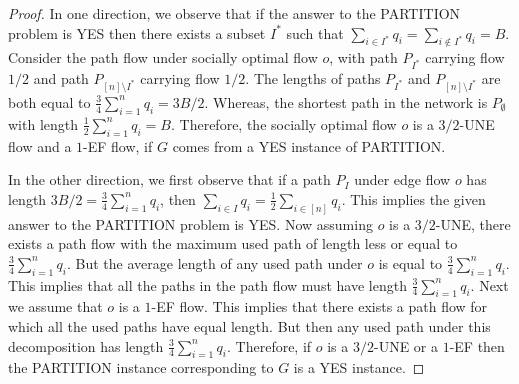 \begin{proof}
In one direction, we observe that if the answer to the PARTITION problem is YES then there exists a subset $I^*$ such that $\sum_{i\in I^*} q_i = \sum_{i \notin I^*}q_i = B$. Consider the path flow under socially optimal flow $o$, with path $P_{I^*}$ carrying flow $1/2$ and path $P_{[n]\setminus I^*}$ carrying flow $1/2$.  The lengths of paths $P_{I^*}$ and $P_{[n]\setminus I^*}$ are both  equal to $\frac{3}{4}\sum_{i=1}^{n} q_i = 3B/2$. Whereas, the shortest path in the network is  $P_{\emptyset}$  with length $\frac{1}{2}\sum_{i=1}^{n} q_i = B$. Therefore, the socially optimal flow $o$ is a $3/2$-UNE flow and a $1$-EF flow, if $G$ comes from a YES instance of PARTITION. 



In the other direction, we first observe that if a path $P_{I}$ under edge flow $o$ has length $3B/2 = \frac{3}{4}\sum_{i=1}^{n} q_i$, then $\sum_{i\in I} q_i = \frac{1}{2}\sum_{i\in [n]} q_i$. This implies the given answer to the PARTITION problem is YES. Now assuming $o$ is a $3/2$-UNE, there exists a path flow with the maximum used path of length less or equal to $\frac{3}{4}\sum_{i=1}^{n} q_i$. But the average length of any used path under $o$ is equal to $\frac{3}{4}\sum_{i=1}^{n} q_i$. This implies that all the paths in the path flow must have length $\frac{3}{4}\sum_{i=1}^{n} q_i$.  Next we assume that $o$ is a $1$-EF flow. This implies that there exists a path flow for which all the used paths have equal length. But then any used path under this decomposition has length $\frac{3}{4}\sum_{i=1}^{n} q_i$. Therefore, if $o$ is a $3/2$-UNE or a $1$-EF then the PARTITION instance corresponding to $G$ is a YES instance.   
\end{proof}
 
